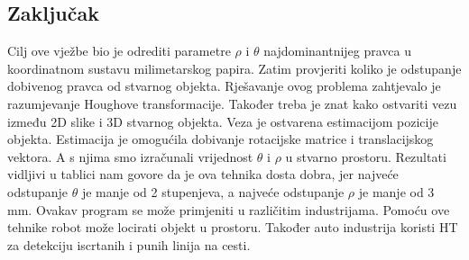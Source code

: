 \subsection{Zaključak}
Cilj ove vježbe bio je odrediti parametre \(\rho\) i \(\theta\)
najdominantnijeg pravca u koordinatnom sustavu milimetarskog papira.
Zatim provjeriti koliko je odstupanje dobivenog pravca od stvarnog
objekta. Rješavanje ovog problema zahtjevalo je razumjevanje Houghove
transformacije. Također treba je znat kako ostvariti vezu između 2D
slike i 3D stvarnog objekta. Veza je ostvarena estimacijom pozicije
objekta. Estimacija je omogućila dobivanje rotacijske matrice i
translacijskog vektora. A s njima smo izračunali vrijednost \(\theta\) i
\(\rho\) u stvarno prostoru.
Rezultati vidljivi u tablici nam govore da je ova tehnika dosta dobra,
jer najveće odstupanje \(\theta\) je manje od 2 stupenjeva, a najveće
odstupanje \(\rho\) je manje od 3 mm.
Ovakav program se može primjeniti u različitim industrijama. Pomoću ove
tehnike robot može locirati objekt u prostoru. Također auto industrija
koristi HT za detekciju iscrtanih i punih linija na cesti.



